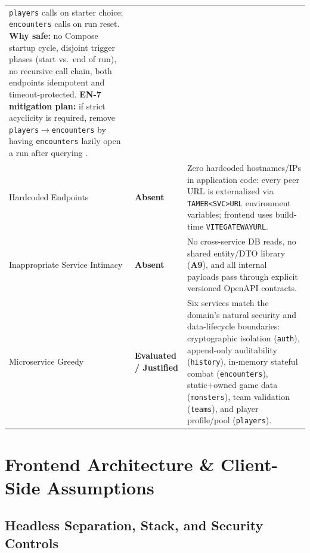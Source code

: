 \documentclass[10.5pt,a4paper]{article}
\DeclareRobustCommand{\code}[1]{\begingroup\def\_{\textunderscore\allowbreak}\texttt{#1}\endgroup}
\newcommand{\badgeok}[1]{\textsf{\textbf{\color{okgreen}#1}}}
\begin{document}
\begin{table}[H]
\begin{tabularx}{\linewidth}{@{}L{3.6cm}C{2.15cm}Y@{}}
\code{players} calls  on starter choice; \code{encounters} calls  on run reset. \textbf{Why safe:} no Compose startup cycle, disjoint trigger phases (start vs.\ end of run), no recursive call chain, both endpoints idempotent and timeout-protected. \textbf{EN-7 mitigation plan:} if strict acyclicity is required, remove \code{players}$\to$\code{encounters} by having \code{encounters} lazily open a run after querying . \\
\addlinespace
Hardcoded Endpoints & \badgeok{Absent} &
Zero hardcoded hostnames/IPs in application code: every peer URL is externalized via \code{TAMER\_<SVC>\_URL} environment variables; frontend uses build-time \code{VITE\_GATEWAY\_URL}. \\
\addlinespace
Inappropriate Service Intimacy & \badgeok{Absent} &
No cross-service DB reads, no shared entity/DTO library (\textbf{A9}), and all internal payloads pass through explicit versioned  OpenAPI contracts. \\
\addlinespace
Microservice Greedy & \badgeok{Evaluated / Justified} &
Six services match the domain's natural security and data-lifecycle boundaries: cryptographic isolation (\code{auth}), append-only auditability (\code{history}), in-memory stateful combat (\code{encounters}), static+owned game data (\code{monsters}), team validation (\code{teams}), and player profile/pool (\code{players}). \\
\bottomrule
\end{tabularx}
\end{table}

\section{Frontend Architecture \& Client-Side Assumptions}
\label{sec:frontend}

\subsection{Headless Separation, Stack, and Security Controls}
\end{document}
